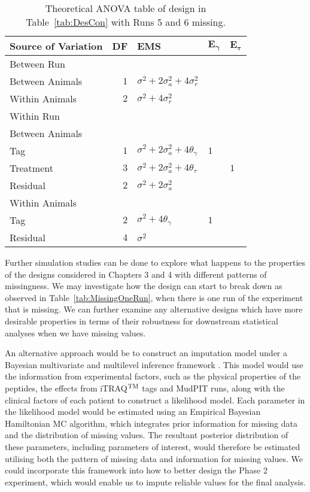\begin{table}[!ht]
\centering
 \caption{Theoretical ANOVA table of design in Table~\ref{tab:DesCon} with Runs 5 and 6 missing.}
\begin{tabular}[t]{lrlll} 
\toprule 
\multicolumn{1}{l}{\textbf{Source of Variation}} & \multicolumn{1}{l}{\textbf{DF}} & \multicolumn{1}{l}{\textbf{EMS}}&\multicolumn{1}{l}{$\bm{E_{\gamma}}$}&\multicolumn{1}{l}{$\bm{E_{\tau}}$}\\ 
\midrule 
Between Run &  &  & & \\ 
\quad Between Animals & $1$ & $\sigma^2+2\sigma_{a}^2+4\sigma_{r}^2$ & & \\ 
\quad Within Animals & $2$ & $\sigma^2+4\sigma_{r}^2$ & & \\ \hline 
Within Run &  &  & & \\ 
\quad Between Animals &  &  & & \\ 
\quad \quad Tag & $1$ & $\sigma^2+2\sigma_{a}^2+4\theta_{\gamma}$ &$1$ & \\ 
\quad \quad Treatment & $3$ & $\sigma^2+2\sigma_{a}^2+4\theta_{\tau}$ & & $1$\\ 
\quad \quad Residual & $2$ & $\sigma^2+2\sigma_{a}^2$ & & \\ \hline 
\quad Within Animals &  &  & & \\ 
\quad \quad Tag & $2$ & $\sigma^2+4\theta_{\gamma}$ &$1$ & \\ 
\quad \quad Residual & $4$ & $\sigma^2$ & & \\ 
\bottomrule 
 \end{tabular} 
 \label{tab:MissingTwoRuns} 
\end{table} 
 
Further simulation studies can be done to explore what happens to the properties of the designs considered in Chapters 3 and 4 with different patterns of missingness. We may investigate how the design can start to break down as observed in Table~\ref{tab:MissingOneRun}, when there is one run of the experiment that is missing. We can further examine any alternative designs which have more desirable properties in terms of their robustness for downstream statistical analyses when we have missing values.

An alternative approach would be to construct an imputation model under a Bayesian multivariate and multilevel inference framework \citep{Zeng2017}. This model would use the information from experimental factors, such as the physical properties of the peptides, the effects from iTRAQ$^{\rm TM}$ tags and MudPIT runs, along with the clinical factors of each patient to construct a likelihood model. Each parameter in the likelihood model would be estimated using an Empirical Bayesian Hamiltonian MC algorithm, which integrates prior information for missing data and the distribution of missing values. The resultant posterior distribution of these parameters, including parameters of interest, would therefore be estimated utilising both the pattern of missing data and information for missing values. We could incorporate this framework into how to better design the Phase 2 experiment, which would enable us to impute reliable values for the final analysis.

